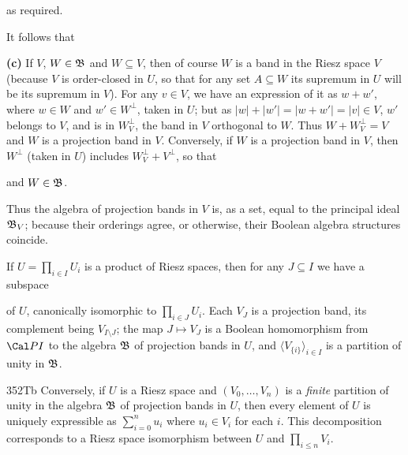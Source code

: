 {
     
     
\noindent as required.
     
It follows that
     
     
     
\medskip
     
{\bf (c)} If $V$, $W\in\frak B$ and $W\subseteq V$, then of course $W$
is a band in the Riesz space $V$ (because $V$ is order-closed in $U$, so
that for any set $A\subseteq W$ its supremum in $U$ will be its supremum
in $V$).   For any $v\in V$, we have an expression of it as $w+w'$,
where $w\in W$ and $w'\in W^{\perp}$, taken in $U$;  but as
$|w|+|w'|=|w+w'|=|v|\in V$, $w'$ belongs to $V$, and is in
$W^{\perp}_V$, the band in $V$ orthogonal to $W$.   Thus
$W+W^{\perp}_V=V$ and $W$ is a projection band in $V$.   Conversely, if
$W$ is a projection band in $V$, then $W^{\perp}$ (taken in $U$)
includes $W^{\perp}_V+V^{\perp}$, so that
     
     
\noindent and $W\in\frak
B$.
     
Thus the algebra of projection bands in $V$ is, as a set, equal to the
principal ideal $\frak B_V$;  because their orderings agree, or
otherwise, their Boolean algebra structures coincide.
}%
     
 If $U=\prod_{i\in I}U_i$ is a product
of Riesz spaces, then for any $J\subseteq I$ we have a subspace
     
     
\noindent of $U$, canonically isomorphic to $\prod_{i\in J}U_i$.   Each
$V_J$ is a projection band, its complement being $V_{I\setminus J}$;
the map $J\mapsto V_J$ is a Boolean homomorphism from $\Cal PI$ to the
algebra $\frak B$ of projection bands in $U$, and 
$\langle V_{\{i\}}\rangle_{i\in I}$ is a partition of unity in $\frak B$.
     
\spheader 352Tb Conversely, if $U$ is a Riesz space and
$(V_0,\ldots,V_n)$ is a {\it finite} partition of unity in the algebra
$\frak B$ of projection bands in $U$, then every element of $U$ is
uniquely expressible as $\sum_{i=0}^nu_i$ where $u_i\in V_i$ for each
$i$.      This decomposition corresponds to a
Riesz space isomorphism between $U$ and $\prod_{i\le n}V_i$.
     
